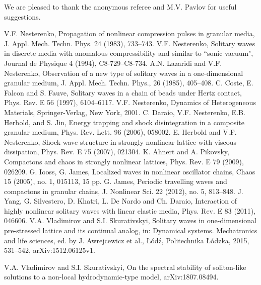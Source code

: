 \documentclass[12pt]{article}
\begin{document}
We are pleased to thank the anonymous referee and M.V. Pavlov for useful suggestions.
%
%
\begin{thebibliography}{99}

 V.F. Nesterenko, Propagation of nonlinear compression pulses in granular media,
 J. Appl. Mech. Techn. Phys. 24  (1983), 733--743.
V.F. Nesterenko, Solitary waves in discrete media with anomalous compressibility and similar to ``sonic vacuum", Journal de Physique 4 (1994),  C8-729--C8-734.
A.N. Lazaridi and V.F. Nesterenko,
Observation of a new type of solitary waves in a one-dimensional granular medium,
 J. Appl. Mech. Techn. Phys.,  26 (1985), 405--408.
C. Coste, E. Falcon and S. Fauve,
Solitary waves in a chain of beads under Hertz contact,
{Phys. Rev.}  E 56 (1997), 6104--6117.
V.F. Nesterenko,
Dynamics of Heterogeneous Materials,
{Springer-Verlag}, {New York}, {2001}.
{C. Daraio, V.F. Nesterenko, E.B. Herbold, and S. Jin},
Energy trapping and shock disintegration in a composite granular medium,
{Phys. Rev. Lett.} 96 (2006), {058002}.
{ E. Herbold and  V.F. Nesterenko},
Shock wave structure in strongly nonlinear lattice with viscous dissipation,
  {Phys. Rev.} E 75
 {(2007)}, {021304}.
{K. Ahnert and A. Pikovsky},
Compactons and chaos in strongly nonlinear lattices,
{Phys. Rev.} E 79 (2009),
{026209}.
G. Iooss, G. James, Localized waves in nonlinear oscillator chains, Chaos 15 (2005), no. 1, 015113, 15 pp.
 G.  James, Periodic travelling waves and compactons in granular chains, J. Nonlinear Sci. 22 (2012), no. 5, 813--848.
{J. Yang,  G. Silvestero,  D. Khatri,  L. De Nardo and Ch. Daraio},
Interaction of highly nonlinear solitary waves with linear elastic media,
{Phys. Rev.} E 83 (2011), {046606}.
V.A. Vladimirov  and S.I. Skurativskyi, Solitary  waves in  one-dimensional pre-stressed lattice and its continual analog, in: {Dynamical systems. Mechatronics and life sciences}, ed. by J. Awrejcewicz et al., \L\'od\'z, Politechnika \L\'odzka, 2015, %
531--542, arXiv:1512.06125v1.

V.A. Vladimirov  and S.I. Skurativskyi, On the spectral stability of soliton-like solutions to a non-local hydrodynamic-type model, arXiv:1807.08494.


\end{thebibliography}
\end{document}
